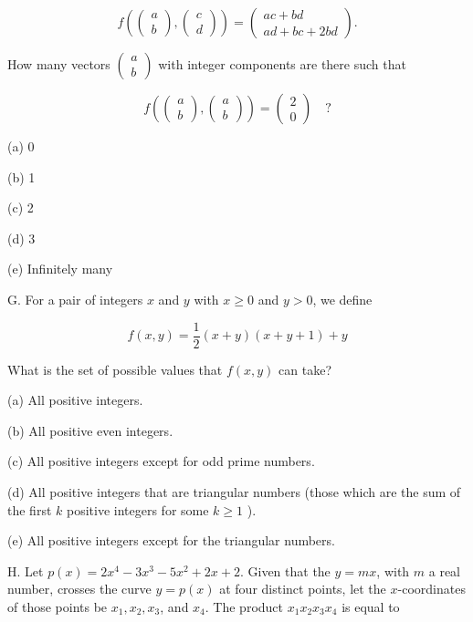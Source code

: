 \documentclass[10pt]{article}
\begin{document}
$$
f\left(\left(\begin{array}{l}
a \\
b
\end{array}\right),\left(\begin{array}{l}
c \\
d
\end{array}\right)\right)=\left(\begin{array}{c}
a c+b d \\
a d+b c+2 b d
\end{array}\right) .
$$

How many vectors $\left(\begin{array}{l}a \\ b\end{array}\right)$ with integer components are there such that

$$
f\left(\left(\begin{array}{l}
a \\
b
\end{array}\right),\left(\begin{array}{l}
a \\
b
\end{array}\right)\right)=\left(\begin{array}{l}
2 \\
0
\end{array}\right) \quad ?
$$

(a) 0

(b) 1

(c) 2

(d) 3

(e) Infinitely many

G. For a pair of integers $x$ and $y$ with $x \geq 0$ and $y>0$, we define

$$
f(x, y)=\frac{1}{2}(x+y)(x+y+1)+y
$$

What is the set of possible values that $f(x, y)$ can take?

(a) All positive integers.

(b) All positive even integers.

(c) All positive integers except for odd prime numbers.

(d) All positive integers that are triangular numbers (those which are the sum of the first $k$ positive integers for some $k \geq 1$ ).

(e) All positive integers except for the triangular numbers.

H. Let $p(x)=2 x^{4}-3 x^{3}-5 x^{2}+2 x+2$. Given that the $y=m x$, with $m$ a real number, crosses the curve $y=p(x)$ at four distinct points, let the $x$-coordinates of those points be $x_{1}, x_{2}, x_{3}$, and $x_{4}$. The product $x_{1} x_{2} x_{3} x_{4}$ is equal to
\end{document}
